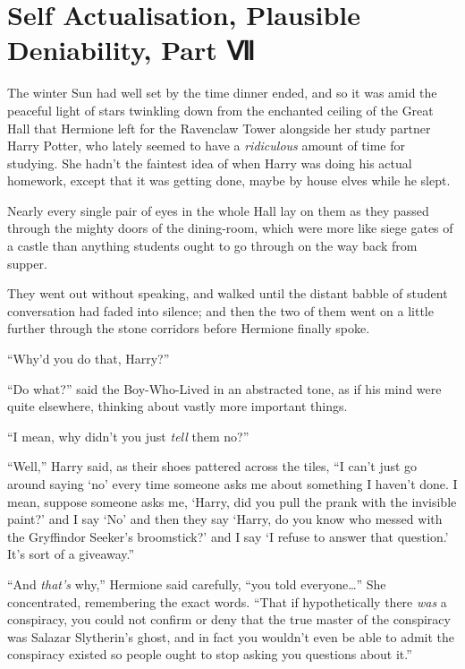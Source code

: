 \chapter{Self Actualisation, Plausible Deniability, Part
Ⅶ}\label{self-actualisation-plausible-deniability-part}

The winter Sun had well set by the time dinner ended, and so it was amid
the peaceful light of stars twinkling down from the enchanted ceiling of
the Great Hall that Hermione left for the Ravenclaw Tower alongside her
study partner Harry Potter, who lately seemed to have a
\emph{ridiculous} amount of time for studying. She hadn't the faintest
idea of when Harry was doing his actual homework, except that it was
getting done, maybe by house elves while he slept.

Nearly every single pair of eyes in the whole Hall lay on them as they
passed through the mighty doors of the dining-room, which were more like
siege gates of a castle than anything students ought to go through on
the way back from supper.

They went out without speaking, and walked until the distant babble of
student conversation had faded into silence; and then the two of them
went on a little further through the stone corridors before Hermione
finally spoke.

``Why'd you do that, Harry?''

``Do what?'' said the Boy-Who-Lived in an abstracted tone, as if his
mind were quite elsewhere, thinking about vastly more important things.

``I mean, why didn't you just \emph{tell} them no?''

``Well,'' Harry said, as their shoes pattered across the tiles, ``I
can't just go around saying `no' every time someone asks me about
something I haven't done. I mean, suppose someone asks me, `Harry, did
you pull the prank with the invisible paint?' and I say `No' and then
they say `Harry, do you know who messed with the Gryffindor Seeker's
broomstick?' and I say `I refuse to answer that question.' It's sort of
a giveaway.''

``And \emph{that's} why,'' Hermione said carefully, ``you told
everyone\ldots{}'' She concentrated, remembering the exact words. ``That
if hypothetically there \emph{was} a conspiracy, you could not confirm
or deny that the true master of the conspiracy was Salazar Slytherin's
ghost, and in fact you wouldn't even be able to admit the conspiracy
existed so people ought to stop asking you questions about it.''

